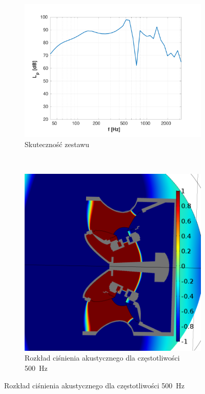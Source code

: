 \documentclass[12pt]{oska}
\begin{document}
		\begin{figure}[!ht]
		\centering
			\begin{subfigure}[b]{.49\textwidth}
			\includegraphics[width=\textwidth,trim={1.25cm .5cm 2cm 1cm},clip]{skutecznosc_comsol.pdf}
				\caption{Skuteczność zestawu}
				\label{r:C_skutecznosc}
			\end{subfigure}
			~
			\begin{subfigure}[b]{.49\textwidth}
				\includegraphics[width=\textwidth]{pres_sig_500Hz.png}
				\caption{Rozkład ciśnienia akustycznego dla częstotliwości \SI{500}{\hertz}}
				\label{r:C_500}
			\end{subfigure}
			

\end{figure}
\end{document}
